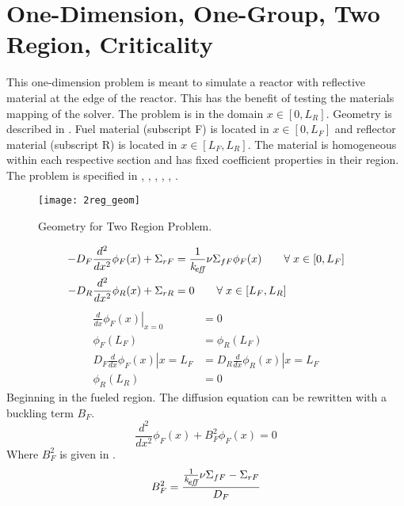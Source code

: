\section{One-Dimension, One-Group, Two Region, Criticality}
  \label{sec:deriv_2reg}
  This one-dimension problem is meant to simulate a reactor with reflective
  material at the edge of the reactor. This has the benefit of testing the
  materials mapping of the solver. The problem is in the domain $x \in [0,L_R]$. 
  Geometry is described in . Fuel material (subscript F) is
  located in $x \in [0,L_F]$ and reflector material (subscript R) is located in 
  $ x \in [L_F,L_R]$. The material is homogeneous within each respective section
  and has fixed coefficient properties in their region. The problem is specified
  in , , ,
  , ,
  .
  \begin{figure}
    \centering
    \texttt{[image: 2reg\_geom]}
    \caption{Geometry for Two Region Problem.}
    \label{fig:2reg_geom}
  \end{figure}
  \begin{align}
    \label{eq:2regF}
    -D_F \frac{d^2}{dx^2} \phi_F(x) + \Sigma_{rF} &= \frac{1}{k_{\!\mbox{\scriptsize \em eff}}} \nu
      \Sigma_{fF} \phi_F(x) \qquad \forall \; x \in [0,L_F] \\
    \label{eq:2regR}
    -D_R \frac{d^2}{dx^2} \phi_R(x) + \Sigma_{rR} &= 0 \qquad \forall 
      \; x \in [L_F,L_R]
  \end{align}
  \begin{align}
    \label{eq:2reg_bc0}
    \left. \frac{d}{dx} \phi_F(x) \right|_{x=0} &= 0 \\
    \label{eq:2reg_flux_continuity}
    \phi_F(L_F) &= \phi_R(L_F) \\
    \label{eq:2reg_current_continuity}
    D_F \left. \frac{d}{dx} \phi_F(x) \right|{x=L_F} &= 
      D_R \left. \frac{d}{dx} \phi_R(x) \right|{x=L_F} \\
    \label{eq:2reg_bcLR}
    \phi_R(L_R) &= 0
  \end{align}
  Beginning in the fueled region. The diffusion equation  can be
  rewritten with a buckling term $B_F$.
  \begin{equation}
    \label{eq:2regF_buckle}
    \frac{d^2}{dx^2} \phi_F(x) + B_F^2 \phi_F(x) = 0 
  \end{equation}
  Where $B_F^2$ is given in .
  \begin{equation}
    \label{eq:2regF_b2}
    B_F^2 = \frac{\frac{1}{k_{\!\mbox{\scriptsize \em eff}}} \nu \Sigma_{fF} - \Sigma_{rF}}{D_F}
  \end{equation}
